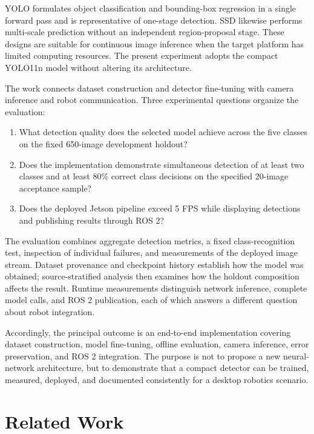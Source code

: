 \documentclass[12pt,a4paper]{article}
\begin{document}
YOLO formulates object classification and bounding-box regression in a single forward pass and is representative of one-stage detection\cite{redmon2016yolo}. SSD likewise performs multi-scale prediction without an independent region-proposal stage\cite{liu2016ssd}. These designs are suitable for continuous image inference when the target platform has limited computing resources. The present experiment adopts the compact YOLO11n model without altering its architecture.

The work connects dataset construction and detector fine-tuning with camera inference and robot communication. Three experimental questions organize the evaluation:
\begin{enumerate}[label=\textbf{EQ\arabic*.},leftmargin=3.8em]
\item What detection quality does the selected model achieve across the five classes on the fixed 650-image development holdout?
\item Does the implementation demonstrate simultaneous detection of at least two classes and at least 80\% correct class decisions on the specified 20-image acceptance sample?
\item Does the deployed Jetson pipeline exceed 5 FPS while displaying detections and publishing results through ROS 2?
\end{enumerate}

The evaluation combines aggregate detection metrics, a fixed class-recognition test, inspection of individual failures, and measurements of the deployed image stream. Dataset provenance and checkpoint history establish how the model was obtained; source-stratified analysis then examines how the holdout composition affects the result. Runtime measurements distinguish network inference, complete model calls, and ROS 2 publication, each of which answers a different question about robot integration.

Accordingly, the principal outcome is an end-to-end implementation covering dataset construction, model fine-tuning, offline evaluation, camera inference, error preservation, and ROS 2 integration. The purpose is not to propose a new neural-network architecture, but to demonstrate that a compact detector can be trained, measured, deployed, and documented consistently for a desktop robotics scenario.

\section{Related Work}
\end{document}
